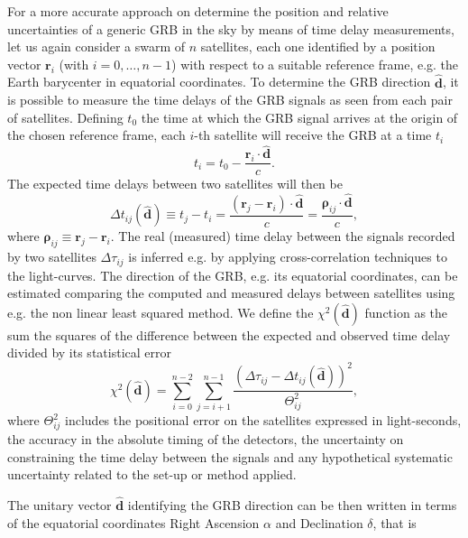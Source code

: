 \documentclass[]{spie}  %
\renewcommand\vec{\bm}
\begin{document}
For a more accurate approach on determine the position and relative uncertainties of a generic GRB in the sky by means of time delay measurements, let us again consider a swarm of $n$ satellites, each one identified by a position vector $\vec{r}_i$ (with $i=0,\dots, n-1$) with respect to a suitable reference frame, e.g. the Earth barycenter in equatorial coordinates.
To determine the GRB direction $\hat{\vec{d}}$, it is possible to measure the time delays of the GRB signals as seen from each pair of  satellites. 
Defining $t_0$ the time at which the GRB signal arrives at the origin of the chosen reference frame, each $i$-th satellite will receive the GRB at a time $t_i$
\begin{equation}
  t_i = t_0 - \frac{\vec{r}_i \cdot \hat{\vec{d}}}{c}.
\end{equation}
The expected time delays between two satellites will then be
\begin{equation}
    \Delta t_{ij}(\hat{\vec{d}}) \equiv t_j - t_i = \frac{(\vec{r}_j - \vec{r}_i) \cdot \hat{\vec{d}}}{c} =  \frac{\vec{\rho}_{ij} \cdot \hat{\vec{d}}}{c},
\label{eq:delayexp}
\end{equation}
where $\vec{\rho}_{ij} \equiv \vec{r}_j - \vec{r}_i$.
The real (measured) time delay between the signals recorded by two satellites $\Delta \tau_{ij}$ is inferred e.g. by applying cross-correlation techniques to the light-curves.
The direction of the GRB, e.g. its equatorial coordinates, can be estimated comparing the computed and measured delays between satellites using e.g. the non linear least squared method.
We define the $\chi^2(\hat{\vec{d}})$ function as the sum the squares of the difference between the expected and observed time delay divided by its statistical error
  \begin{equation}
    \chi^2(\hat{\vec{d}}) = \sum_{i = 0}^{n - 2}\sum_{j = i + 1}^{n - 1} \frac{(\Delta \tau_{ij} - \Delta t_{ij}(\hat{\vec{d}}))^2}{\Theta_{ij}^2},
    \label{eq:chisq}
  \end{equation}
where $\Theta_{ij}^2$ includes the positional error on the satellites expressed in light-seconds, the accuracy in the absolute timing of the detectors, the uncertainty on constraining the time delay between the signals and any hypothetical systematic uncertainty related to the set-up or method applied.
  
The unitary vector $\hat{\vec{d}}$ identifying the GRB direction can be then written in terms of the equatorial coordinates Right Ascension $\alpha$ and Declination $\delta$, that is
  
\end{document}
